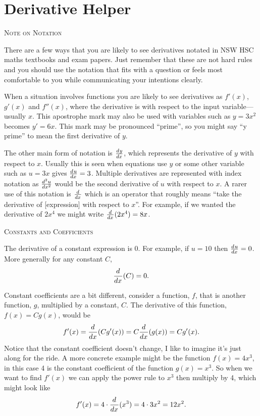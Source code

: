 \documentclass[a4paper,10pt]{article}
\newcommand{\deriv}[3][ ]{\ensuremath\frac{d^{#1}#2}{d#3^{#1}}}
\newcommand{\derivof}[2][ ]{\ensuremath\frac{d^{#1}}{d#2^{#1}}}
\begin{document}
\section*{Derivative Helper}

\begin{multicols*}{2}

{\large\textsc{Note on Notation}}

There are a few ways that you are likely to see derivatives notated in NSW HSC maths 
textbooks and exam papers. Just remember that these are not hard rules and you should 
use the notation that fits with a question or feels most comfortable to you while 
communicating your intentions clearly.

When a situation involves functions you are likely to see derivatives as 
$f'(x)$, $g'(x)$ and $f''(x)$, where the derivative is with respect to the input 
variable---usually $x$. This apostrophe mark may also be used with variables 
such as $y = 3x^2$ becomes $y' = 6x$. This mark may be pronounced ``prime'', 
so you might say ``y prime'' to mean the first derivative of $y$.

The other main form of notation is $\deriv{y}{x}$, which represents the derivative 
of $y$ with respect to $x$. Usually this is seen when equations use $y$ or some 
other variable such as $u = 3x$ gives $\deriv{u}{x} = 3$. Multiple derivatives are 
represented with index notation as $\deriv[2]{u}{x}$ would be the second derivative of 
$u$ with respect to $x$. A rarer use of this notation is $\derivof{x}$ which is an 
operator that roughly means ``take the derivative of [expression] with respect to $x$''.
For example, if we wanted the derivative of $2x^4$ we might write $\derivof{x}(2x^4) = 8x$.

{\large\rule{0em}{1.5em}\textsc{Constants and Coefficients}}

The derivative of a constant expression is 0. For example, if $u = 10$ then 
$\deriv{u}{x} = 0$. More generally for any constant $C$, 
$$\derivof{x}(C) = 0.$$

Constant coefficients are a bit different, consider a function, $f$, that is 
another function, $g$, multiplied by a constant, $C$. The derivative of 
this function, $f(x) = Cg(x)$, would be 
$$f'(x) = \derivof{x}(Cg'(x)) = C\derivof{x}(g(x)) = Cg'(x).$$
Notice that the constant coefficient doesn't change, I like to imagine it's 
just along for the ride. A more concrete example might be the function 
$f(x) = 4x^3$, in this case 4 is the constant coefficient of the function 
$g(x) = x^3$. So when we want to find $f'(x)$ we can apply the power 
rule to $x^3$ then multiply by 4, which might look like 
$$f'(x) = 4 \cdot \derivof{x}(x^3) = 4\cdot 3x^2 = 12x^2.$$


\end{multicols*}
\end{document}
